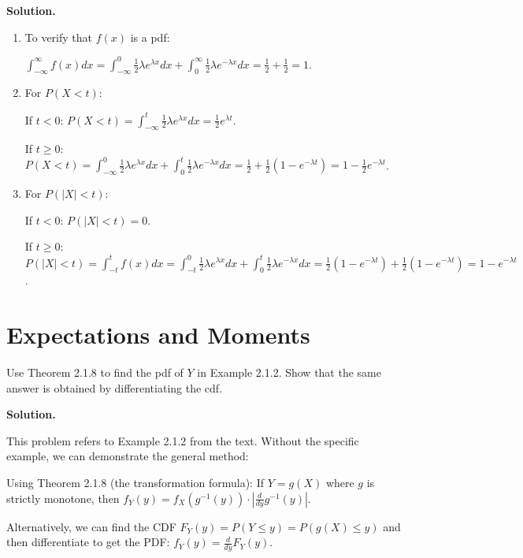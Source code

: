 \noindent\textbf{Solution.}
\begin{enumerate}[label=(\alph*)]
    \item To verify that $f(x)$ is a pdf:
    
    $\int_{-\infty}^{\infty} f(x)dx = \int_{-\infty}^0 \frac{1}{2}\lambda e^{\lambda x}dx + \int_0^{\infty} \frac{1}{2}\lambda e^{-\lambda x}dx = \frac{1}{2} + \frac{1}{2} = 1$.
    
    \item For $P(X < t)$:
    
    If $t < 0$: $P(X < t) = \int_{-\infty}^t \frac{1}{2}\lambda e^{\lambda x}dx = \frac{1}{2}e^{\lambda t}$.
    
    If $t \geq 0$: $P(X < t) = \int_{-\infty}^0 \frac{1}{2}\lambda e^{\lambda x}dx + \int_0^t \frac{1}{2}\lambda e^{-\lambda x}dx = \frac{1}{2} + \frac{1}{2}(1-e^{-\lambda t}) = 1 - \frac{1}{2}e^{-\lambda t}$.
    
    \item For $P(|X| < t)$:
    
    If $t < 0$: $P(|X| < t) = 0$.
    
    If $t \geq 0$: $P(|X| < t) = \int_{-t}^t f(x)dx = \int_{-t}^0 \frac{1}{2}\lambda e^{\lambda x}dx + \int_0^t \frac{1}{2}\lambda e^{-\lambda x}dx = \frac{1}{2}(1-e^{-\lambda t}) + \frac{1}{2}(1-e^{-\lambda t}) = 1 - e^{-\lambda t}$.
\end{enumerate}

\section{Expectations and Moments}

\begin{problembox}
Use Theorem 2.1.8 to find the pdf of $Y$ in Example 2.1.2. Show that the same answer is obtained by differentiating the cdf.
\end{problembox}

\noindent\textbf{Solution.}

This problem refers to Example 2.1.2 from the text. Without the specific example, we can demonstrate the general method:

Using Theorem 2.1.8 (the transformation formula): If $Y = g(X)$ where $g$ is strictly monotone, then $f_Y(y) = f_X(g^{-1}(y)) \cdot |\frac{d}{dy}g^{-1}(y)|$.

Alternatively, we can find the CDF $F_Y(y) = P(Y \leq y) = P(g(X) \leq y)$ and then differentiate to get the PDF: $f_Y(y) = \frac{d}{dy}F_Y(y)$.

